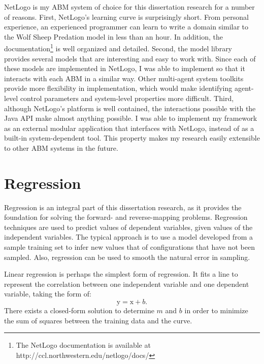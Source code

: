 NetLogo is my ABM system of choice for this dissertation research for a number of reasons.
First, NetLogo's learning curve is surprisingly short.
From personal experience, an experienced programmer can learn to write a domain similar to the Wolf Sheep Predation model in less than an hour.
In addition, the documentation\footnote{The NetLogo documentation is available at http://ccl.northwestern.edu/netlogo/docs/} is well organized and detailed.
Second, the model library provides several models that are interesting and easy to work with.
Since each of these models are implemented in NetLogo, I was able to implement \fw so that it interacts with each ABM in a similar way.
Other multi-agent system toolkits provide more flexibility in implementation, which would make identifying agent-level control parameters and system-level properties more difficult.
Third, although NetLogo's platform is well contained, the interactions possible with the Java API make almost anything possible.
I was able to implement my framework as an external modular application that interfaces with NetLogo, instead of as a built-in system-dependent tool.
This property makes my research easily extensible to other ABM systems in the future.



\section{Regression}\label{sec:reg}
Regression is an integral part of this dissertation research, as it provides the foundation for solving the forward- and reverse-mapping problems.
Regression techniques are used to predict values of dependent variables, given values of the independent variables.
The typical approach is to use a model developed from a sample training set to infer new values that of configurations that have not been sampled.
Also, regression can be used to smooth the natural error in sampling.

Linear regression is perhaps the simplest form of regression. It fits a line to represent the correlation between one independent variable and one dependent variable, taking the form of:
\[\mathrm{y} = \mathrm{x} + b.\]
There exists a closed-form solution to determine $m$ and $b$ in order to minimize the sum of squares between the training data and the curve.

